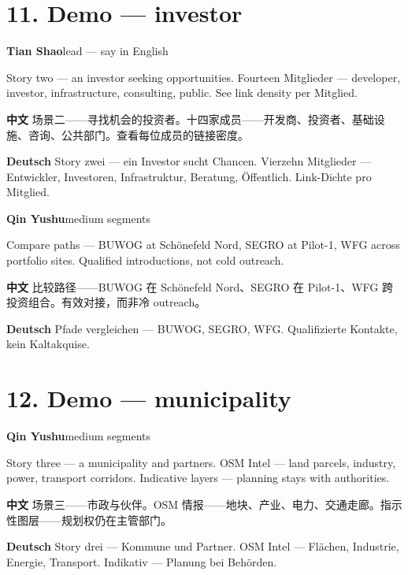 \documentclass[11pt,a4paper]{ctexart}
\newenvironment{speakerblock}[2]{%
  \par\medskip
  {\color{berblue}\textbf{#1}}\hfill{\small\textcolor{bergrey}{#2}}\par
  \vspace{0.25em}
}{\par\medskip}
\begin{document}
\section{11. Demo — investor}

\begin{speakerblock}{Tian Shao}{lead — say in English}
\begin{englishbox}
Story two — an investor seeking opportunities. Fourteen Mitglieder — developer, investor, infrastructure, consulting, public. See link density per Mitglied.
\end{englishbox}

\textbf{中文} 场景二——寻找机会的投资者。十四家成员——开发商、投资者、基础设施、咨询、公共部门。查看每位成员的链接密度。

\textbf{Deutsch} Story zwei — ein Investor sucht Chancen. Vierzehn Mitglieder — Entwickler, Investoren, Infrastruktur, Beratung, Öffentlich. Link-Dichte pro Mitglied.
\end{speakerblock}


\begin{speakerblock}{Qin Yushu}{medium segments}
\begin{englishbox}
Compare paths — BUWOG at Schönefeld Nord, SEGRO at Pilot-1, WFG across portfolio sites. Qualified introductions, not cold outreach.
\end{englishbox}

\textbf{中文} 比较路径——BUWOG 在 Schönefeld Nord、SEGRO 在 Pilot-1、WFG 跨投资组合。有效对接，而非冷 outreach。

\textbf{Deutsch} Pfade vergleichen — BUWOG, SEGRO, WFG. Qualifizierte Kontakte, kein Kaltakquise.
\end{speakerblock}



\section{12. Demo — municipality}

\begin{speakerblock}{Qin Yushu}{medium segments}
\begin{englishbox}
Story three — a municipality and partners. OSM Intel — land parcels, industry, power, transport corridors. Indicative layers — planning stays with authorities.
\end{englishbox}

\textbf{中文} 场景三——市政与伙伴。OSM 情报——地块、产业、电力、交通走廊。指示性图层——规划权仍在主管部门。

\textbf{Deutsch} Story drei — Kommune und Partner. OSM Intel — Flächen, Industrie, Energie, Transport. Indikativ — Planung bei Behörden.
\end{speakerblock}
\end{document}
